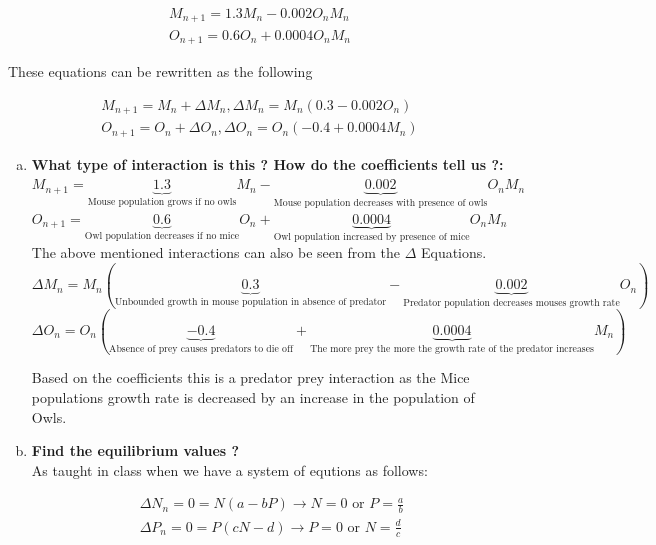\documentclass{article}
\begin{document}
\begin{enumerate}[1.]
\begin{gather*}
M_{n+1} = 1.3M_n - 0.002O_nM_n \\
O_{n+1} = 0.6O_n + 0.0004O_nM_n
\end{gather*}

These equations can be rewritten as the following

\begin{gather*}
M_{n+1} = M_n + \Delta M_n, \Delta M_n = M_n(0.3 - 0.002O_n) \\
O_{n+1} = O_n + \Delta O_n, \Delta O_n = O_n(-0.4 + 0.0004M_n)
\end{gather*}

\begin{enumerate}[(a)]
\item
\textbf{What type of interaction is this ? How do the coefficients tell us ?:} \\
$M_{n+1} = \underbrace{1.3}_{\text{Mouse population grows if no owls}}M_n - \underbrace{0.002}_{\text{Mouse population decreases with presence of owls}}O_nM_n$ \\
$O_{n+1} =  \underbrace{0.6}_{\text{Owl population decreases if no mice}}O_n + \underbrace{0.0004}_{\text{Owl population increased by presence of mice}}O_nM_n$ \\

The above mentioned interactions can also be seen from the $\Delta$ Equations. \\
$\Delta M_n = M_n(\underbrace{0.3}_{\text{Unbounded growth in mouse population in absence of predator}} - \underbrace{0.002}_{\text{Predator population decreases mouses growth rate}}O_n) $\\
$\Delta O_n = O_n(\underbrace{-0.4}_{\text{Absence of prey causes predators to die off}} + \underbrace{0.0004}_{\text{The more prey the more the growth rate of the predator increases}}M_n)$

Based on the coefficients this is a predator prey interaction as the Mice populations growth rate is decreased by an increase in the population of Owls.
\item
\textbf{Find the equilibrium values ?} \\
As taught in class when we have a system of equtions as follows:

\begin{gather*}
\Delta N_n = 0 = N(a - bP) \to N = 0 \text{ or } P = \frac{a}{b} \\
\Delta P_n = 0 = P(cN - d) \to P = 0 \text{ or } N = \frac{d}{c}
\end{gather*}


\end{enumerate}
\end{enumerate}
\end{document}
